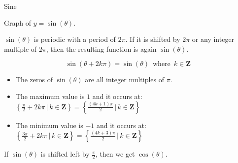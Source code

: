 \documentclass{ximera}
\begin{document}
\begin{example} Sine



Graph of $y = \sin(\theta)$.

\begin{image}
\end{image}



$\sin(\theta)$ is periodic with a period of $2\pi$.  If it is shifted by $2\pi$ or any integer multiple of $2\pi$, then the resulting function is again $\sin(\theta)$.


\[    \sin(\theta + 2k\pi) = \sin(\theta)   \,   \text{ where }  \,  k \in \textbf{Z}       \]



\begin{itemize}
\item The zeros of $\sin(\theta)$ are all integer multiples of $\pi$.
\item The maximum value is $1$ and it occurs at:  $\left\{     \frac{\pi}{2} + 2k\pi \, | \, k \in \textbf{Z}     \right\} = \left\{     \frac{(4k+1)\pi}{2} \, | \, k \in \textbf{Z}     \right\}$
\item The minimum value is $-1$ and it occurs at:  $\left\{    \frac{3\pi}{2} + 2k\pi \, | \, k \in \textbf{Z}     \right\} = \left\{    \frac{(4k+3)\pi}{2} \, | \, k \in \textbf{Z}     \right\}$
\end{itemize}


If $\sin(\theta)$ is shifted left by $\frac{\pi}{2}$, then we get $\cos(\theta)$.



\end{example}
\end{document}
